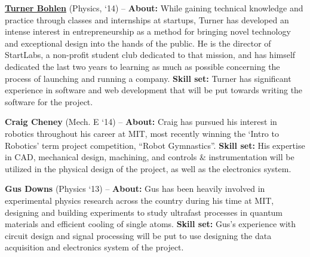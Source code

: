 \documentclass[10pt]{article}
\begin{document}
\vspace{.2cm}

\noindent \textbf{\href{http://www.turnerbohlen.com}{Turner Bohlen}} (Physics, `14) -- \textbf{About:} While gaining technical knowledge and practice through classes and internships at startups, Turner has developed an intense interest in entrepreneurship as a method for bringing novel technology and exceptional design into the hands of the public. He is the director of StartLabs, a non-profit student club dedicated to that mission, and has himself dedicated the last two years to learning as much as possible concerning the process of launching and running a company. \textbf{Skill set:} Turner has significant experience in software and web development that will be put towards writing the software for the project.

\vspace{.2cm}

\noindent \textbf{Craig Cheney} (Mech. E `14) -- \textbf{About:} Craig has pursued his interest in robotics throughout his career at MIT, most recently winning the `Intro to Robotics' term project competition, ``Robot Gymnastics''. \textbf{Skill set:} His expertise in CAD, mechanical design, machining, and controls & instrumentation will be utilized in the physical design of the project, as well as the electronics system.

\vspace{.2cm}

\noindent \textbf{Gus Downs} (Physics `13) -- \textbf{About:} Gus has been heavily involved in experimental physics research across the country during his time at MIT, designing and building experiments to study ultrafast processes in quantum materials and efficient cooling of single atoms. \textbf{Skill set:} Gus's experience with circuit design and signal processing will be put to use designing the data acquisition and electronics system of the project.
\end{document}

